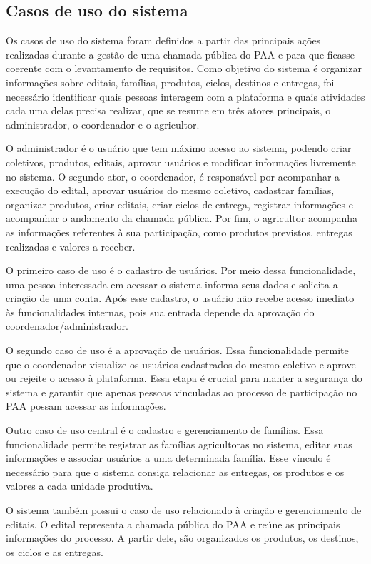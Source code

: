 \documentclass[grad,pdftex]{poli}
\begin{document}
\subsection{Casos de uso do sistema}

Os casos de uso do sistema foram definidos a partir das principais ações realizadas durante a gestão de uma chamada pública do PAA e para que ficasse coerente com o levantamento de requisitos. Como objetivo do sistema é organizar informações sobre editais, famílias, produtos, ciclos, destinos e entregas, foi necessário identificar quais pessoas interagem com a plataforma e quais atividades cada uma delas precisa realizar, que se resume em três atores principais, o administrador, o coordenador e o agricultor.

O administrador é o usuário que tem máximo acesso ao sistema, podendo criar coletivos, produtos, editais, aprovar usuários e modificar informações livremente no sistema. O segundo ator, o coordenador, é responsável por acompanhar a execução do edital, aprovar usuários do mesmo coletivo, cadastrar famílias, organizar produtos, criar editais, criar ciclos de entrega, registrar informações e acompanhar o andamento da chamada pública. Por fim, o agricultor acompanha as informações referentes à sua participação, como produtos previstos, entregas realizadas e valores a receber.

O primeiro caso de uso é o cadastro de usuários. Por meio dessa funcionalidade, uma pessoa interessada em acessar o sistema informa seus dados e solicita a criação de uma conta. Após esse cadastro, o usuário não recebe acesso imediato às funcionalidades internas, pois sua entrada depende da aprovação do coordenador/administrador.

O segundo caso de uso é a aprovação de usuários. Essa funcionalidade permite que o coordenador visualize os usuários cadastrados do mesmo coletivo e aprove ou rejeite o acesso à plataforma. Essa etapa é crucial para manter a segurança do sistema e garantir que apenas pessoas vinculadas ao processo de participação no PAA possam acessar as informações.

Outro caso de uso central é o cadastro e gerenciamento de famílias. Essa funcionalidade permite registrar as famílias agricultoras no sistema, editar suas informações e associar usuários a uma determinada família. Esse vínculo é necessário para que o sistema consiga relacionar as entregas, os produtos e os valores a cada unidade produtiva.

O sistema também possui o caso de uso relacionado à criação e gerenciamento de editais. O edital representa a chamada pública do PAA e reúne as principais informações do processo. A partir dele, são organizados os produtos, os destinos, os ciclos e as entregas.
\end{document}

